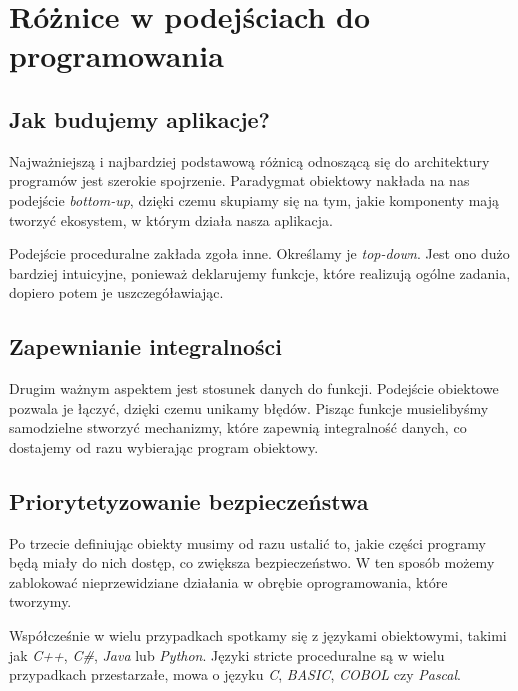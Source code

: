 \newpage

\section{Różnice w podejściach do programowania}

\subsection{Jak budujemy aplikacje?}

\begin{flushleft}
    Najważniejszą i najbardziej podstawową różnicą odnoszącą się do architektury programów jest szerokie spojrzenie. Paradygmat obiektowy nakłada na nas podejście \emph{bottom-up}, dzięki czemu skupiamy się na tym, jakie komponenty mają tworzyć ekosystem, w którym działa nasza aplikacja. 
\end{flushleft}

\begin{flushleft}
    Podejście proceduralne zakłada zgoła inne. Określamy je  \emph{top-down}. Jest ono dużo bardziej intuicyjne, ponieważ deklarujemy funkcje, które realizują ogólne zadania, dopiero potem je uszczegóławiając.
\end{flushleft}

\subsection{Zapewnianie integralności}

\begin{flushleft}
    Drugim ważnym aspektem jest stosunek danych do funkcji. Podejście obiektowe pozwala je łączyć, dzięki czemu unikamy błędów. Pisząc funkcje musielibyśmy samodzielne stworzyć mechanizmy, które zapewnią integralność danych, co dostajemy od razu wybierając program obiektowy.
\end{flushleft}

\subsection{Priorytetyzowanie bezpieczeństwa}

\begin{flushleft}
    Po trzecie definiując obiekty musimy od razu ustalić to, jakie części programy będą miały do nich dostęp, co zwiększa bezpieczeństwo. W ten sposób możemy zablokować nieprzewidziane działania w obrębie oprogramowania, które tworzymy. \cite{security}
\end{flushleft}

\begin{mdframed}[backgroundcolor=yellow!20]
    Współcześnie w wielu przypadkach spotkamy się z językami obiektowymi, takimi jak \emph{C++}, \emph{C\#}, \emph{Java} lub \emph{Python}. Języki stricte proceduralne są w wielu przypadkach przestarzałe, mowa o języku \emph{C}, \emph{BASIC}, \emph{COBOL} czy \emph{Pascal}. \cite{languages}
\end{mdframed}
